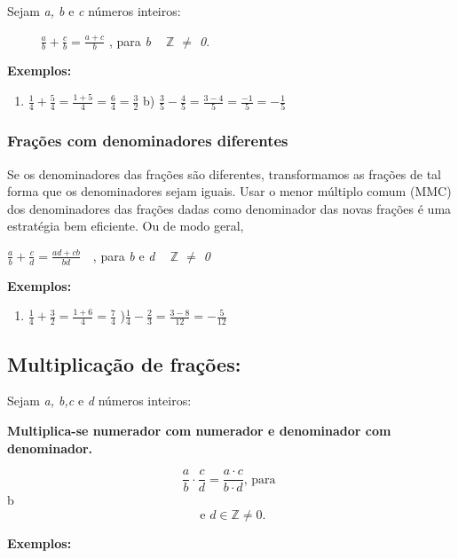 Sejam \textit{a, b} e \textit{c} números inteiros: 

\textbf{\quad ~~~~  \( \frac{a}{b}+\frac{c}{b}=\frac{a+c}{b} \) \quad }{\fontsize{16pt}{19.2pt}\selectfont \quad , para \textit{b ~  \( \mathbb{Z} \)  $ \neq $  0}.}

\textbf{Exemplos: }

\begin{enumerate}
	\item  \( \frac{1}{4}+\frac{5}{4}=\frac{1+5}{4}=\frac{6}{4}=\frac{3}{2} \) \quad \quad b)  \( \frac{3}{5}-\frac{4}{5}=\frac{3-4}{5}=\frac{-1}{5}=-\frac{1}{5} \) \quad 
\end{enumerate}

\subsubsection{Frações com denominadores diferentes}

\begin{justify}
Se os denominadores das frações são diferentes, transformamos as frações de tal forma que os denominadores sejam iguais. Usar o menor múltiplo comum (MMC) dos denominadores das frações dadas como denominador das novas frações é uma estratégia bem eficiente. Ou de modo geral, 
\end{justify}

\begin{justify}
\quad  \( \frac{a}{b}+\frac{c}{d}=\frac{ad+cb}{bd}~~~ \) {\fontsize{16pt}{19.2pt}\selectfont  , para \textit{b }e\textit{ d  ~  \( \mathbb{Z} \)   $ \neq $  0} \qedsymbol{}}
\end{justify}

\textbf{Exemplos:}

\begin{enumerate}
	\item  \( \frac{1}{4}+\frac{3}{2}=\frac{1+6}{4}=\frac{7}{4} \) \quad \quad {}){\fontsize{16pt}{19.2pt}\selectfont   \( \frac{1}{4}-\frac{2}{3}=\frac{3-8}{12}=-\frac{5}{12} \) }
\end{enumerate}

\subsection{Multiplicação de frações:}

Sejam \textit{a, b,c} e \textit{d} números inteiros: 

\begin{caixa}
\textbf{Multiplica-se numerador com numerador e denominador com denominador. }

$$ \frac{a}{b} \cdot \frac{c}{d}=\frac{a \cdot c }{b \cdot d}\textrm{,  para }$$ b $$\textrm{ e } d \in \mathbb{Z} \neq 0 \textrm{.}$$
\end{caixa}
\textbf{Exemplos:}

